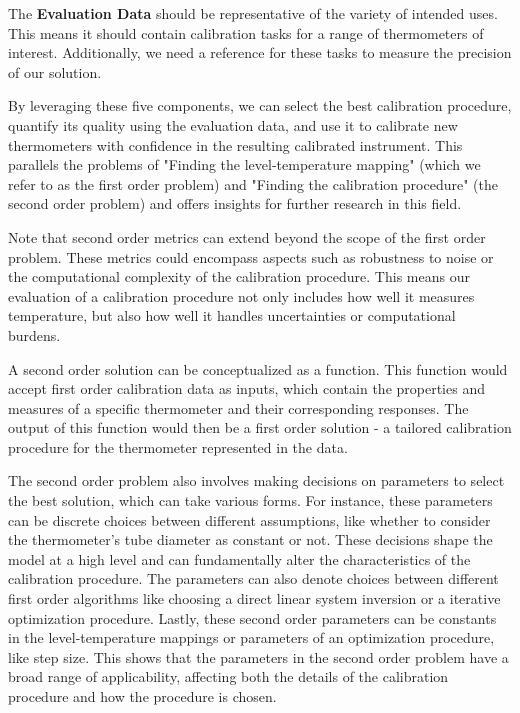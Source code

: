 \begin{bibunit}
The \textbf{Evaluation Data} should be representative of the variety of intended uses. This means it should contain calibration tasks for a range of thermometers of interest. Additionally, we need a reference for these tasks to measure the precision of our solution.

By leveraging these five components, we can select the best calibration procedure, quantify its quality using the evaluation data, and use it to calibrate new thermometers with confidence in the resulting calibrated instrument. This parallels the problems of "Finding the level-temperature mapping" (which we refer to as the first order problem) and "Finding the calibration procedure" (the second order problem) and offers insights for further research in this field.

Note that second order metrics can extend beyond the scope of the first order problem. These metrics could encompass aspects such as robustness to noise or the computational complexity of the calibration procedure. This means our evaluation of a calibration procedure not only includes how well it measures temperature, but also how well it handles uncertainties or computational burdens.

A second order solution can be conceptualized as a function. This function would accept first order calibration data as inputs, which contain the properties and measures of a specific thermometer and their corresponding responses. The output of this function would then be a first order solution - a tailored calibration procedure for the thermometer represented in the data.

The second order problem also involves making decisions on parameters to select the best solution, which can take various forms. For instance, these parameters can be discrete choices between different assumptions, like whether to consider the thermometer's tube diameter as constant or not. These decisions shape the model at a high level and can fundamentally alter the characteristics of the calibration procedure. The parameters can also denote choices between different first order algorithms like choosing a direct linear system inversion or a iterative optimization procedure. Lastly, these second order parameters can be constants in the level-temperature mappings or parameters of an optimization procedure, like step size. This shows that the parameters in the second order problem have a broad range of applicability, affecting both the details of the calibration procedure and how the procedure is chosen.



\end{bibunit}
